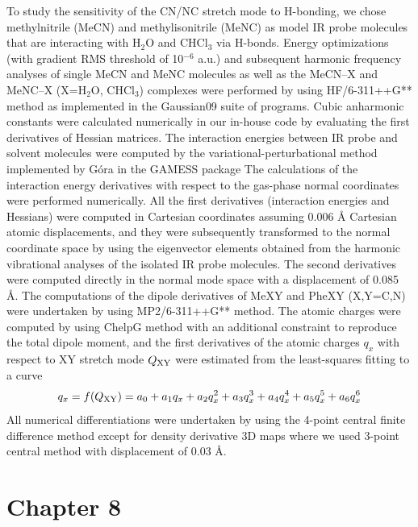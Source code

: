 \documentclass[a4paper,titlepage,twoside,fleqn,12pt]{book}
\begin{document}
\begin{appendices}
\begin{refsection}
To study the sensitivity of the CN/NC stretch mode to H-bonding, we chose methylnitrile
(MeCN) and methylisonitrile (MeNC) as model IR probe molecules that are interacting with 
H$_2$O and CHCl$_3$ via H-bonds. Energy optimizations (with gradient RMS threshold of 10$^{-6}$ a.u.) 
and subsequent harmonic frequency analyses of single MeCN and MeNC molecules as well 
as the MeCN--X and MeNC--X (X=H$_2$O, CHCl$_3$) complexes were performed by using 
HF/6-311++G** method%
as implemented in the Gaussian09 suite of programs.%
Cubic 
anharmonic constants were calculated numerically in our in\hyp{}house code by evaluating the 
first derivatives of Hessian matrices. The interaction energies between IR probe and solvent 
molecules were computed by the variational\hyp{}perturbational method%
implemented by G{\'o}ra%
in the GAMESS package%
The calculations of the interaction energy derivatives with respect 
to the gas\hyp{}phase normal coordinates were performed numerically. All the first derivatives 
(interaction energies and Hessians) were computed in Cartesian coordinates assuming 0.006 \AA
Cartesian atomic displacements, and they were subsequently transformed to the normal 
coordinate space by using the eigenvector elements obtained from the harmonic vibrational 
analyses of the isolated IR probe molecules. The second derivatives were computed directly 
in the normal mode space with a displacement of 0.085 \AA. 
The computations of the dipole derivatives of MeXY and PheXY (X,Y=C,N) were 
undertaken by using MP2/6-311++G** method.%
The atomic charges were computed by 
using ChelpG method%
with an additional constraint to reproduce the total dipole moment, 
and the first derivatives of the atomic charges $q_x$ with respect to XY 
stretch mode $Q_{\rm XY}$ were estimated from the least\hyp{}squares fitting to a curve 
%
\begin{equation}
q_x=f(Q_{\rm XY}) = a_0 + a_1 q_x + a_2 q_x^2 + a_3 q_x^3 + a_4 q_x^4 + a_5 q_x^5 + a_6 q_x^6
\end{equation}
%
All numerical differentiations were undertaken by using the 4-point central finite 
difference method except for density derivative 3D maps where we used 3-point central 
method with displacement of 0.03 \AA.

\section{Chapter 8}

\printbibliography[heading=subbibintoc,title={References}]
\end{refsection}




















\end{appendices}
\end{document}
